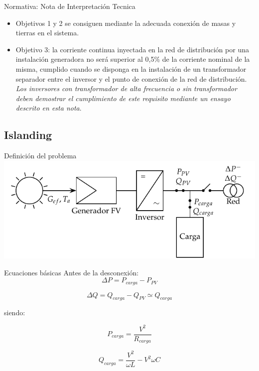 \documentclass[xcolor={usenames,svgnames,dvipsnames}]{beamer}
\begin{document}
\begin{frame}[label=sec-2-5-7]{Normativa: Nota de Interpretación Tecnica}
\begin{itemize}
\item Objetivos 1 y 2 se consiguen mediante la adecuada conexión de masas y tierras en el sistema.

\item Objetivo 3: \guillemotleft{}\alert{la corriente continua inyectada en la red de distribución por una instalación generadora no será superior al 0,5\% de la corriente nominal de la misma}\guillemotright{}, cumplido \guillemotleft{}\alert{cuando se disponga en la instalación de un transformador separador entre el inversor y el punto de conexión de la red de distribución}\guillemotright{}. \emph{Los inversores con transformador de alta frecuencia o sin transformador deben demostrar el cumplimiento de este requisito mediante un ensayo descrito en esta nota}.
\end{itemize}
\end{frame}

\subsection{Islanding}
\label{sec-2-6}
\begin{frame}[label=sec-2-6-1]{Definición del problema}
\includegraphics[width=.9\linewidth]{../figs/Isla.pdf}
\end{frame}

\begin{frame}[label=sec-2-6-2]{Ecuaciones básicas}
Antes de la desconexión:$$\Delta P=P_{carga}-P_{PV}$$

$$\Delta Q=Q_{carga}-Q_{PV}\simeq Q_{carga}$$

siendo:

$$P_{carga}=\frac{V^{2}}{R_{carga}}$$

$$Q_{carga}=\frac{V^{2}}{\omega L}-V^{2}\omega C$$
\end{frame}
\end{document}
